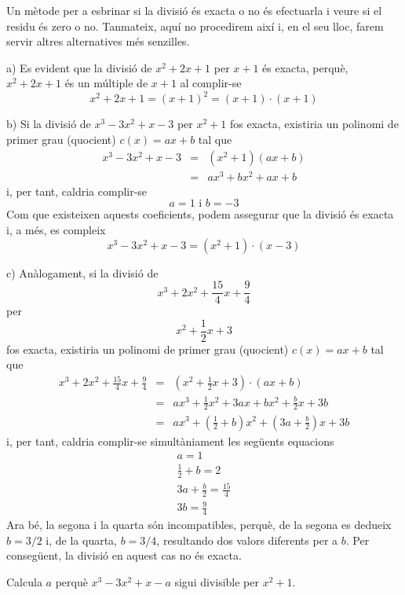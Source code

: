 \begin{solucio}
Un mètode per a esbrinar si la divisió és exacta o no és efectuarla
i veure si el residu és zero o no. Tanmateix, aquí no procedirem així i, en el seu lloc, farem servir altres alternatives més senzilles.

a) Es evident que la divisió de $x^{2}+2x+1$ per $x+1$ és exacta,
perquè, $x^{2}+2x+1$ és un múltiple de $x+1$ al complir-se\[
x^{2}+2x+1=(x+1)^{2}=(x+1)\cdot (x+1)
\]

b) Si la divisió de $x^{3}-3x^{2}+x-3$ per $x^{2}+1$ fos exacta,
existiria un polinomi de primer grau (quocient) $c(x)=ax+b$ tal que\begin{eqnarray*}
x^{3}-3x^{2}+x-3 &=&(x^{2}+1)(ax+b) \\
&=&ax^{3}+bx^{2}+ax+b
\end{eqnarray*}i, per tant, caldria complir-se\[
a=1\text{ \ \ i \ \ }b=-3
\]Com que existeixen aquests coeficients, podem assegurar que la divisió és
exacta i, a més, es compleix\[
x^{3}-3x^{2}+x-3=(x^{2}+1)\cdot (x-3)
\]

c) Anàlogament, si la divisió de\[
x^{3}+2x^{2}+\frac{15}{4}x+\frac{9}{4}
\]
per\[
x^{2}+\frac{1}{2}x+3
\]fos exacta, existiria un polinomi de primer grau (quocient) $c(x)=ax+b$ tal que\begin{eqnarray*}
x^{3}+2x^{2}+\frac{15}{4}x+\frac{9}{4} &=&\left( x^{2}+\frac{1}{2}x+3\right)
\cdot \left( ax+b\right) \\
&=&ax^{3}+\frac{1}{2}x^{2}+3ax+bx^{2}+\frac{b}{2}x+3b \\
&=&ax^{3}+\left( \frac{1}{2}+b\right) x^{2}+\left( 3a+\frac{b}{2}\right) x+3b
\end{eqnarray*}i, per tant, caldria complir-se simultàniament les següents
equacions\[
\begin{array}{c}
a=1 \\
\frac{1}{2}+b=2 \\
3a+\frac{b}{2}=\frac{15}{4} \\
3b=\frac{9}{4}\end{array}\]Ara bé, la segona i la quarta són incompatibles, perquè, de la segona es
dedueix $b=3/2$ i, de la quarta, $b=3/4$, resultando dos valors diferents
per a $b$. Per consegüent, la divisió en aquest cas no és exacta.
\end{solucio}

\begin{exercici}
Calcula $a$ perquè $x^{3}-3x^{2}+x-a$ sigui divisible per $x^{2}+1$.
\end{exercici}

